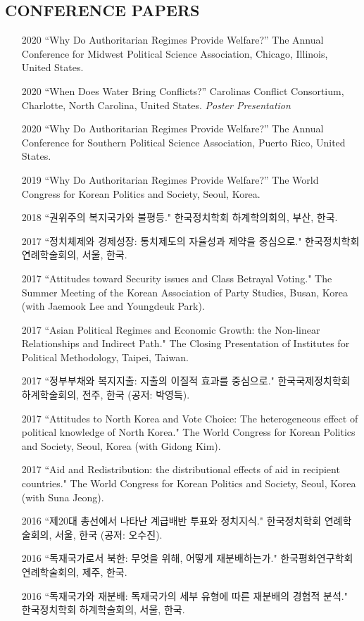 \documentclass[11pt]{res} %
\begin{document}
\begin{resume}
\section{CONFERENCE PAPERS}
\begin{itemize}
	\item[2020] ``Why Do Authoritarian Regimes Provide Welfare?'' The Annual Conference for Midwest Political Science Association, Chicago, Illinois, United States.
	\item[2020] ``When Does Water Bring Conflicts?'' Carolinas Conflict Consortium, Charlotte, North Carolina, United States. \textit{Poster Presentation}
	\item[2020] ``Why Do Authoritarian Regimes Provide Welfare?'' The Annual Conference for Southern Political Science Association, Puerto Rico, United States.
	\item[2019] ``Why Do Authoritarian Regimes Provide Welfare?'' The World Congress for Korean Politics and Society, Seoul, Korea.
	\item[2018] ``권위주의 복지국가와 불평등." 한국정치학회 하계학의회의, 부산, 한국.
	\item[2017] ``정치체제와 경제성장: 통치제도의 자율성과 제약을 중심으로." 한국정치학회 연례학술회의, 서울, 한국.
	\item[2017] ``Attitudes toward Security issues and Class Betrayal Voting." The Summer Meeting of the Korean Association of Party Studies, Busan, Korea (with Jaemook Lee and Youngdeuk Park).
	\item[2017] ``Asian Political Regimes and Economic Growth: the Non-linear Relationships and Indirect Path." The Closing Presentation of Institutes for Political Methodology, Taipei, Taiwan.
	\item[2017] ``정부부채와 복지지출: 지출의 이질적 효과를 중심으로." 한국국제정치학회 하계학술회의, 전주, 한국 (공저: 박영득).
	\item[2017] ``Attitudes to North Korea and Vote Choice: The heterogeneous effect of political knowledge of North Korea." The World Congress for Korean Politics and Society, Seoul, Korea (with Gidong Kim).
	\item[2017] ``Aid and Redistribution: the distributional effects of aid in recipient countries." The World Congress for Korean Politics and Society, Seoul, Korea (with Suna Jeong).
	\item[2016] ``제20대 총선에서 나타난 계급배반 투표와 정치지식." 한국정치학회 연례학술회의, 서울, 한국 (공저: 오수진).
	\item[2016] ``독재국가로서 북한: 무엇을 위해, 어떻게 재분배하는가." 한국평화연구학회 연례학술회의, 제주, 한국.
	\item[2016] ``독재국가와 재분배: 독재국가의 세부 유형에 따른 재분배의 경험적 분석." 한국정치학회 하계학술회의, 서울, 한국.
\end{itemize}


\end{resume}
\end{document}
